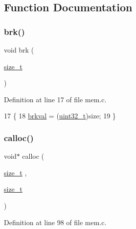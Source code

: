 \subsection{Function Documentation}
\mbox{\label{a00170_aebb0480990fb66ce618d040a195143c9_aebb0480990fb66ce618d040a195143c9}} 
\subsubsection{\texorpdfstring{brk()}{brk()}}
{\footnotesize\ttfamily void brk (\begin{DoxyParamCaption}\item[{\hyperlink{a00140_a29d85914ddff32967d85ada69854206d_a29d85914ddff32967d85ada69854206d}{size\+\_\+t}}]{ }\end{DoxyParamCaption})}



Definition at line 17 of file mem.\+c.


\begin{DoxyCode}
17                       \{
18     \hyperlink{a00167_a33fb44061f3432e7d04085bcef339974_a33fb44061f3432e7d04085bcef339974}{brkval} = (\hyperlink{a00140_a435d1572bf3f880d55459d9805097f62_a435d1572bf3f880d55459d9805097f62}{uint32\_t})size;
19 \}
\end{DoxyCode}
\mbox{\label{a00170_a77e880b1033d5a912be4333fc5d31eef_a77e880b1033d5a912be4333fc5d31eef}} 
\subsubsection{\texorpdfstring{calloc()}{calloc()}}
{\footnotesize\ttfamily void$\ast$ calloc (\begin{DoxyParamCaption}\item[{\hyperlink{a00140_a29d85914ddff32967d85ada69854206d_a29d85914ddff32967d85ada69854206d}{size\+\_\+t}}]{,  }\item[{\hyperlink{a00140_a29d85914ddff32967d85ada69854206d_a29d85914ddff32967d85ada69854206d}{size\+\_\+t}}]{ }\end{DoxyParamCaption})}



Definition at line 98 of file mem.\+c.


